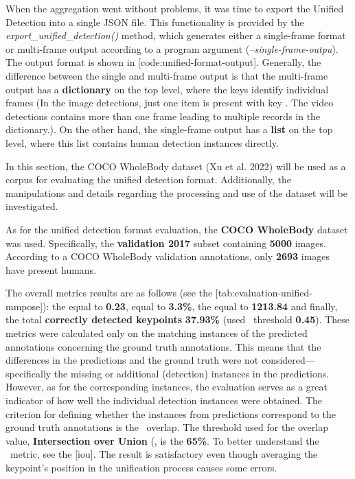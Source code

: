 When the aggregation went without problems, it was time to export the Unified Detection into a single JSON file. This functionality is provided by the {\it export_unified_detection()} method, which generates either a single-frame format or multi-frame output according to a program argument ({\it --single-frame-outpu}). The output format is shown in [code:unified-format-output]. Generally, the difference between the single and multi-frame output is that the multi-frame output has a {\bf dictionary} on the top level, where the keys identify individual frames (In the image detections, just one item is present with key . The video detections contains more than one frame leading to multiple records in the dictionary.). On the other hand, the single-frame output has a {\bf list} on the top level, where this list contains human detection instances directly.


In this section, the COCO WholeBody dataset (Xu et al. 2022) will be used as a corpus for evaluating the unified detection format. Additionally, the manipulations and details regarding the processing and use of the dataset will be investigated.

As for the unified detection format evaluation, the {\bf COCO WholeBody} dataset was used. Specifically, the {\bf validation 2017} subset containing {\bf 5000} images. According to a COCO WholeBody validation annotations, only {\bf 2693} images have present humans. 

The overall metrics results are as follows (see the [tab:evaluation-unified-mmpose]): the {\bf \OKS} equal to {\bf 0.23}, {\bf \APE} equal to {\bf 3.3\%}, the {\bf \MSE} equal to {\bf 1213.84} and finally, the total {\bf correctly detected keypoints} {\bf 37.93\%} (used \OKS\ threshold {\bf 0.45}). These metrics were calculated only on the matching instances of the predicted annotations concerning the ground truth annotations. This means that the differences in the predictions and the ground truth were not considered—specifically the missing or additional (detection) instances in the predictions. However, as for the corresponding instances, the evaluation serves as a great indicator of how well the individual detection instances were obtained. The criterion for defining whether the instances from predictions correspond to the ground truth annotations is the \BBOX\ overlap. The threshold used for the overlap value, {\bf Intersection over Union} (\IoU\), is the {\bf 65\%}. To better understand the \IoU\ metric, see the [iou]. The result is satisfactory even though averaging the keypoint's position in the unification process causes some errors.

